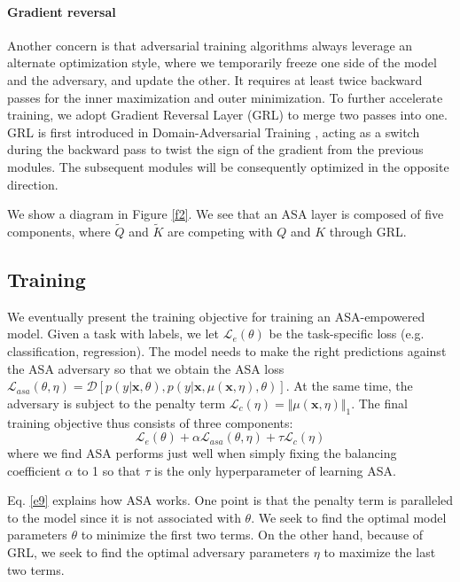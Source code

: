 \documentclass[letterpaper]{article} \usepackage{aaai23}  \usepackage{times}  \usepackage{helvet}  \usepackage{courier}  \usepackage[hyphens]{url}  \usepackage{graphicx} \urlstyle{rm} \def\UrlFont{\rm}  \usepackage{natbib}  \usepackage{caption} \frenchspacing  \setlength{\pdfpagewidth}{8.5in}  \setlength{\pdfpageheight}{11in}  \usepackage{algorithm}
\begin{document}
\paragraph{Gradient reversal} Another concern is that adversarial training algorithms always leverage an alternate optimization style, where we temporarily freeze one side of the model and the adversary, and update the other. It requires at least twice backward passes for the inner maximization and outer minimization. To further accelerate training, we adopt Gradient Reversal Layer (GRL) to merge two passes into one. GRL is first introduced in Domain-Adversarial Training \citep{DBLP:conf/icml/GaninL15}, acting as a switch during the backward pass to twist the sign of the gradient from the previous modules. The subsequent modules will be consequently optimized in the opposite direction.

We show a diagram in Figure \ref{f2}. We see that an ASA layer is composed of five components, where $ \widetilde Q $ and $ \widetilde K $ are competing with $ Q $ and $ K $ through GRL.

\subsection{Training}

We eventually present the training objective for training an ASA-empowered model. Given a task with labels, we let $ \mathcal L_e(\theta) $ be the task-specific loss (e.g. classification, regression). The model needs to make the right predictions against the ASA adversary so that we obtain the ASA loss $ \mathcal L_{asa}(\theta,\eta) = \mathcal D \left[p(y|\mathbf x,\theta),p(y|\mathbf x,\mu(\mathbf x,\eta),\theta)\right] $. At the same time, the adversary is subject to the penalty term $ \mathcal L_c(\eta) = \Vert \mu(\mathbf x,\eta) \Vert_1 $. The final training objective thus consists of three components:
\begin{equation}
\mathcal L_e(\theta) + \alpha \mathcal L_{asa}(\theta,\eta) + \tau \mathcal L_c(\eta)
\label{e9}
\end{equation}
where we find ASA performs just well when simply fixing the balancing coefficient $ \alpha $ to 1 so that $ \tau $ is the only hyperparameter of learning ASA.

Eq. \ref{e9} explains how ASA works. One point is that the penalty term is paralleled to the model since it is not associated with $ \theta $. We seek to find the optimal model parameters $ \theta $ to minimize the first two terms. On the other hand, because of GRL, we seek to find the optimal adversary parameters $ \eta $ to maximize the last two terms.
\end{document}
